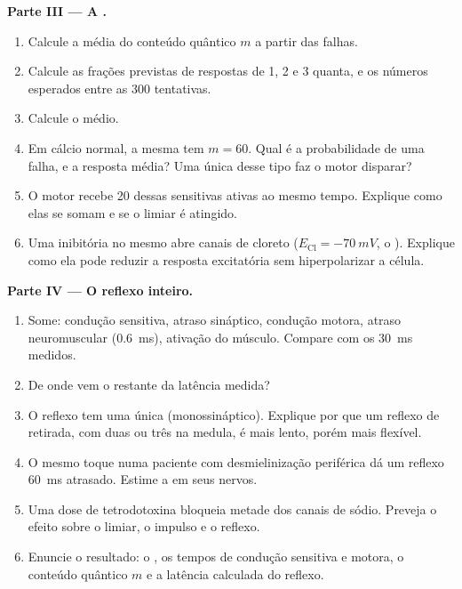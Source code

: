 \begin{problem}
\medskip
\noindent\textbf{Parte III --- A .}
\begin{enumerate}[resume]
  \item Calcule a média do conteúdo quântico $m$ a partir das falhas.
  \item Calcule as frações previstas de respostas de 1, 2 e 3 quanta, e
        os números esperados entre as 300 tentativas.
  \item Calcule o  médio.
  \item Em cálcio normal, a mesma  tem $m = 60$. Qual é a
        probabilidade de uma falha, e a resposta média? Uma única 
        desse tipo faz o  motor disparar?
  \item O  motor recebe \num{20} dessas  sensitivas
        ativas ao mesmo tempo. Explique como elas se somam e se o limiar
        é atingido.
  \item Uma  inibitória no mesmo  abre canais de cloreto
        ($E_{\mathrm{Cl}} = \qty{-70}{mV}$, o ).
        Explique como ela pode reduzir a resposta excitatória sem
        hiperpolarizar a célula.
\end{enumerate}

\medskip
\noindent\textbf{Parte IV --- O reflexo inteiro.}
\begin{enumerate}[resume]
  \item Some: condução sensitiva, atraso sináptico, condução motora,
        atraso neuromuscular (\qty{0.6}{ms}), ativação do músculo.
        Compare com os \qty{30}{ms} medidos.
  \item De onde vem o restante da latência medida?
  \item O reflexo tem uma única  (monossináptico). Explique por
        que um reflexo de retirada, com duas ou três  na medula,
        é mais lento, porém mais flexível.
  \item O mesmo toque numa paciente com desmielinização periférica dá um
        reflexo \qty{60}{ms} atrasado. Estime a  em
        seus nervos.
  \item Uma dose de tetrodotoxina bloqueia metade dos canais de sódio.
        Preveja o efeito sobre o limiar, o impulso e o reflexo.
  \item Enuncie o resultado: o , os tempos de
        condução sensitiva e motora, o conteúdo quântico $m$ e a latência
        calculada do reflexo.
\end{enumerate}
\end{problem}
